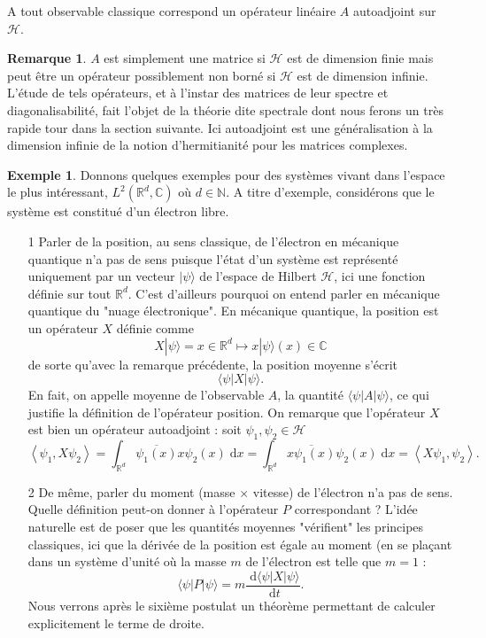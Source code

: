 \documentclass[12pt,openany,a4paper, titlepage]{article}
\newcommand{\la}{\left\langle}
\newcommand{\ra}{\right\rangle}
\newcommand{\dd}{\;\mathrm{d}}
\newcommand{\R}{\mathbb{R}}
\newcommand{\C}{\mathbb{C}}
\newcommand{\N}{\mathbb{N}}
\newcommand{\HH}{\mathcal{H}}
\theoremstyle{definition}
\theoremstyle{definition}
\theoremstyle{definition}
\newtheorem{ex}{Exemple}
\theoremstyle{definition}
\theoremstyle{definition}
\newtheorem{rem}{Remarque}
\theoremstyle{definition}
\begin{document}
\vspace{3mm}
\begin{tcolorbox}[colback=gray!5!white,
                  colframe=gray!80!white,
                  title= Postulat 2 : Principe de correspondance ]
A tout observable classique correspond un opérateur linéaire $A$ autoadjoint sur $\HH$.
\end{tcolorbox}
\vspace{3mm}

\begin{rem}
    $A$ est simplement une matrice si $\HH$ est de dimension finie mais peut être un opérateur possiblement non borné si $\HH$ est de dimension infinie. L'étude de tels opérateurs, et à l'instar des matrices de leur spectre et diagonalisabilité, fait l'objet de la théorie dite spectrale dont nous ferons un très rapide tour dans la section suivante. Ici autoadjoint est une généralisation à la dimension infinie de la notion d'hermitianité pour les matrices complexes.
\end{rem}

\begin{ex} 
Donnons quelques exemples pour des systèmes vivant dans l'espace le plus intéressant, $L^2(\R^d,\C)$ où $d\in\N$. A titre d'exemple, considérons que le système est constitué d'un électron libre.
\begin{enumerate}
    \item[1] Parler de la position, au sens classique, de l'électron en mécanique quantique n'a pas de sens puisque l'état d'un système est représenté uniquement par un vecteur $|\psi\rangle$ de l'espace de Hilbert $\HH$, ici une fonction définie sur tout $\R^d$. C'est d'ailleurs pourquoi on entend parler en mécanique quantique du "nuage électronique". En mécanique quantique, la position est un opérateur $X$ définie comme $$X|\psi\rangle = x\in \R^d \mapsto x|\psi\rangle(x) \in \C$$ de sorte qu'avec la remarque précédente, la position moyenne s'écrit $$ \langle \psi | X | \psi \rangle.$$ En fait, on appelle moyenne de l'observable $A$, la quantité $\langle \psi | A | \psi \rangle$, ce qui justifie la définition de l'opérateur position. On remarque que l'opérateur $X$ est bien un opérateur autoadjoint : soit $\psi_1, \psi_2 \in \HH$
    \begin{equation}
        \la\psi_1, X\psi_2\ra =\int_{\R^d}\overline{\psi_1(x)}x\psi_2(x) \dd x
        = \int_{\R^d}\overline{x\psi_1(x)}\psi_2(x) \dd x 
        = \la X\psi_1, \psi_2\ra.
    \end{equation}
    \item[2] De même, parler du moment (masse $\times$ vitesse) de l'électron n'a pas de sens. Quelle définition peut-on donner à l'opérateur $P$ correspondant ? L'idée naturelle est de poser que les quantités moyennes "vérifient" les principes classiques, ici que la dérivée de la position est égale au moment (en se plaçant dans un système d'unité où la masse $m$ de l'électron est telle que $m=1$ :
    $$ \langle \psi |P|\psi\rangle = m\frac{\dd \langle \psi | X | \psi\rangle}{\dd t}.$$
    Nous verrons après le sixième postulat un théorème permettant de calculer explicitement le terme de droite.
\end{enumerate}
\end{ex}
\end{document}

